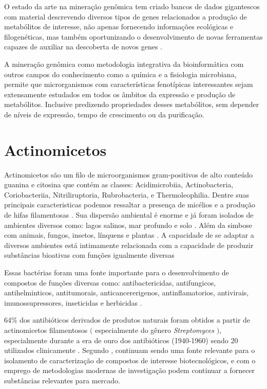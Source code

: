 O estado da arte na mineração genômica tem criado bancos de dados gigantescos
com material descrevendo diversos tipos de genes relacionados a produção de metabólitos
de interesse, não apenas fornecendo informações ecológicas e filogenéticas, mas também oportunizando
o desenvolvimento de novas ferramentas capazes de auxiliar na descoberta de novos genes \cite{chevrette2021confluence}.

A mineração genômica como metodologia integrativa da bioinformática com outros campos
do conhecimento como a química e a fisiologia microbiana, permite que microrganismos com características
fenotípicas interessantes sejam extensamente estudados em todos os âmbitos da expressão e produção
de metabólitos. Inclusive predizendo propriedades desses metabólitos, sem depender de níveis de expressão,
tempo de crescimento ou da purificação. \cite{bauman2021genome, baltz2021genome}

\section{Actinomicetos}

Actinomicetos são um filo de microorganismos gram-positivos de alto conteúdo
guanina e citosina que contém as classes: Acidimicrobiia, Actinobacteria, 
Coriobacteriia, Nitriliruptoria, Rubrobacteria, e Thermoleophilia\cite{yadav2018}.
Dentre suas principais caracteristicas podemos ressaltar a presença de micélios
e a produção de hifas filamentosas \cite{chater2016}. Sua dispersão ambiental é enorme
e já foram isolados de ambientes diversos como: lagos salinos, mar profundo e solo \cite{flores2021,felicio2021,sapkota2020}.
Além da simbose com animais, fungos, insetos, línquens e plantas \cite{hei2021,van2017}.
A capacidade de se adaptar a diversos ambientes está intimamente relacionada com a capacidade
de produzir substâncias bioativas com funções igualmente diversas  \cite{van2020}

Essas bactérias foram uma fonte importante para o desenvolvimento de compostos de funções
diversas como: antibactericidas, antifungicos, antihelminticos, antitumorais, anticancererigenos,
antinflamatorios, antivirais, imunossupressores, inseticidas e herbicidas \cite{demain2009,jose2021}. 

64\% dos antibióticos derivados de produtos naturais foram obtidos a partir de actinomicetos filamentosos $($ especialmente do gênero \textit{Streptomyces} $)$,
especialmente durante a era de ouro dos antibióticos (1940-1960) sendo 20 utilizados clinicamente \cite{hutchings2019}.
Segundo , continuam sendo uma fonte relevante
para o isolamento de caracterização de compostos de interesse biotecnológicos, e com o
emprego de metodologias modernas de investigação podem continuar a fornecer
substâncias relevantes para mercado. 


